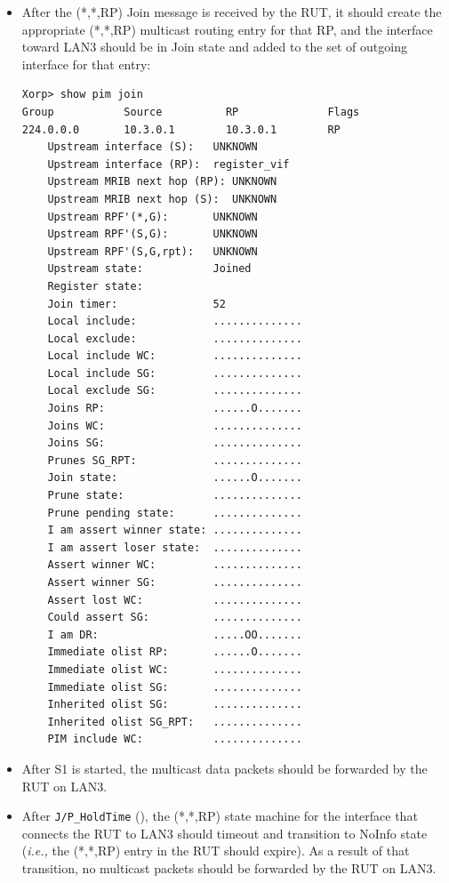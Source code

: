 \documentclass[11pt]{report}
\newcommand{\ie}{\emph{i.e.,}\xspace}
\begin{document}
\begin{itemize}

  \item After the (*,*,RP) Join message is received by the RUT, it
  should create the appropriate (*,*,RP) multicast routing entry for
  that RP, and the interface toward LAN3 should be in Join state and
  added to the set of outgoing interface for that entry:

\begin{verbatim}
Xorp> show pim join 
Group           Source          RP              Flags
224.0.0.0       10.3.0.1        10.3.0.1        RP   
    Upstream interface (S):   UNKNOWN
    Upstream interface (RP):  register_vif
    Upstream MRIB next hop (RP): UNKNOWN
    Upstream MRIB next hop (S):  UNKNOWN
    Upstream RPF'(*,G):       UNKNOWN
    Upstream RPF'(S,G):       UNKNOWN
    Upstream RPF'(S,G,rpt):   UNKNOWN
    Upstream state:           Joined 
    Register state:           
    Join timer:               52
    Local include:            ..............
    Local exclude:            ..............
    Local include WC:         ..............
    Local include SG:         ..............
    Local exclude SG:         ..............
    Joins RP:                 ......O.......
    Joins WC:                 ..............
    Joins SG:                 ..............
    Prunes SG_RPT:            ..............
    Join state:               ......O.......
    Prune state:              ..............
    Prune pending state:      ..............
    I am assert winner state: ..............
    I am assert loser state:  ..............
    Assert winner WC:         ..............
    Assert winner SG:         ..............
    Assert lost WC:           ..............
    Could assert SG:          ..............
    I am DR:                  .....OO.......
    Immediate olist RP:       ......O.......
    Immediate olist WC:       ..............
    Immediate olist SG:       ..............
    Inherited olist SG:       ..............
    Inherited olist SG_RPT:   ..............
    PIM include WC:           ..............
\end{verbatim}

  \item After S1 is started, the multicast data packets should be
  forwarded by the RUT on LAN3.

  \item After \verb=J/P_HoldTime= ({\PimsmJPHoldTime}),
  the (*,*,RP) state machine for the interface that connects the RUT to
  LAN3 should timeout and transition to NoInfo state
  (\ie the (*,*,RP) entry in the RUT should expire).
  As a result of that transition, no multicast packets should be
  forwarded by the RUT on LAN3.

\end{itemize}
\end{document}
